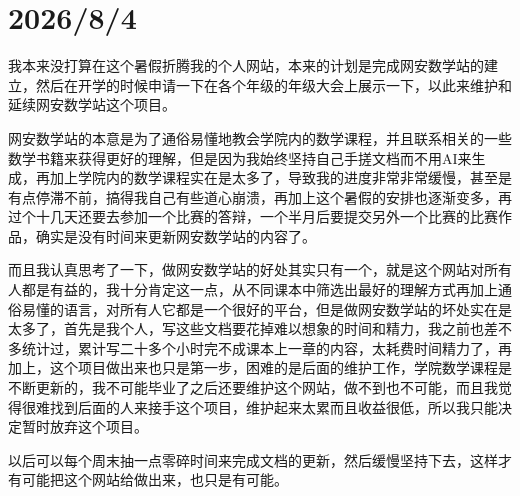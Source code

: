 

\section*{2026/8/4}

我本来没打算在这个暑假折腾我的个人网站，本来的计划是完成网安数学站的建立，然后在开学的时候申请一下在各个年级的年级大会上展示一下，以此来维护和延续网安数学站这个项目。

网安数学站的本意是为了通俗易懂地教会学院内的数学课程，并且联系相关的一些数学书籍来获得更好的理解，但是因为我始终坚持自己手搓文档而不用AI来生成，再加上学院内的数学课程实在是太多了，导致我的进度非常非常缓慢，甚至是有点停滞不前，搞得我自己有些道心崩溃，再加上这个暑假的安排也逐渐变多，再过个十几天还要去参加一个比赛的答辩，一个半月后要提交另外一个比赛的比赛作品，确实是没有时间来更新网安数学站的内容了。

而且我认真思考了一下，做网安数学站的好处其实只有一个，就是这个网站对所有人都是有益的，我十分肯定这一点，从不同课本中筛选出最好的理解方式再加上通俗易懂的语言，对所有人它都是一个很好的平台，但是做网安数学站的坏处实在是太多了，首先是我个人，写这些文档要花掉难以想象的时间和精力，我之前也差不多统计过，累计写二十多个小时完不成课本上一章的内容，太耗费时间精力了，再加上，这个项目做出来也只是第一步，困难的是后面的维护工作，学院数学课程是不断更新的，我不可能毕业了之后还要维护这个网站，做不到也不可能，而且我觉得很难找到后面的人来接手这个项目，维护起来太累而且收益很低，所以我只能决定暂时放弃这个项目。

以后可以每个周末抽一点零碎时间来完成文档的更新，然后缓慢坚持下去，这样才有可能把这个网站给做出来，也只是有可能。




